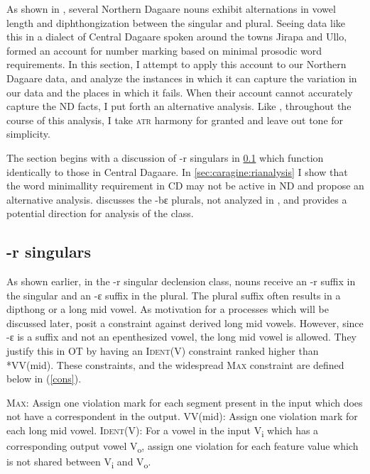 \documentclass[output=paper,colorlinks,citecolor=brown,
]{langscibook}
\begin{document}
As shown in , several Northern Dagaare nouns exhibit alternations in vowel length and diphthongization between the singular and plural. Seeing data like this in a dialect of Central Dagaare spoken around the towns Jirapa and Ullo,
\citet{anttilaProsodic2009} formed an account for number marking based on minimal prosodic word requirements. In this section, I attempt to apply this account to our Northern Dagaare data, and analyze the instances in which it can capture the variation in our data and the places in which it fails. When their account cannot accurately capture the ND facts, I put forth an alternative analysis. Like \citet{anttilaProsodic2009}, throughout the course of this analysis, I take \textsc{atr} harmony for granted and leave out tone for simplicity.

The section begins with a discussion of -r singulars in \ref{sec:caragine:epluralanal} which function identically to those in Central Dagaare. In \ref{sec:caragine:rianalysis} I show that the word minimallity requirement in CD may not be active in ND and propose an alternative analysis.   discusses the -bɛ plurals, not analyzed in \citet{anttilaProsodic2009, anttilaMetrically2019}, and provides a potential direction for analysis of the class.

\subsection{-r singulars} \label{sec:caragine:epluralanal}

As shown earlier, in the -r singular declension class, nouns receive an -r suffix in the singular and an -ɛ suffix in the plural. The plural suffix often results in a dipthong or a long mid vowel. As motivation for a processes which will be discussed later, \citet{anttilaProsodic2009} posit a constraint against derived long mid vowels. However, since -ɛ is a suffix and not an epenthesized vowel, the long mid vowel is allowed. They justify this in OT by having an \textsc{Ident}(V) constraint ranked higher than *VV(mid). These constraints, and the widespread \textsc{Max} constraint are defined below in (\ref{cons}). 

\ea \label{cons} \begin{xlist}
    \ex \textsc{Max}: Assign one violation mark for each segment present in the input which does not have a correspondent in the output.
    \ex  *VV(mid): Assign one violation mark for each long mid vowel.
    \ex \textsc{Ident}(V): For a vowel in the input V\textsubscript{i} which has a corresponding output vowel V\textsubscript{o}, assign one violation for each feature value which is not shared between V\textsubscript{i} and V\textsubscript{o}.
\end{xlist}
\z
\end{document}
